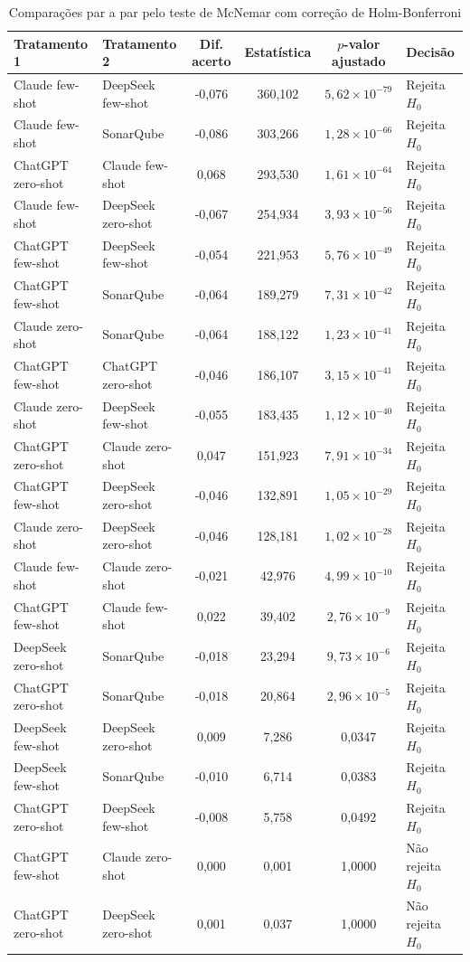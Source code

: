 \begin{table}[H]
\centering
\caption{Comparações par a par pelo teste de McNemar com correção de Holm-Bonferroni}
\label{tab:mcnemar-holm}
\scriptsize
\begin{tabular}{llcccl}
\hline
Tratamento 1 & Tratamento 2 & Dif. acerto & Estatística & $p$-valor ajustado & Decisão \\
\hline
Claude few-shot & DeepSeek few-shot & -0,076 & 360,102 & $5{,}62 \times 10^{-79}$ & Rejeita $H_0$ \\
Claude few-shot & SonarQube & -0,086 & 303,266 & $1{,}28 \times 10^{-66}$ & Rejeita $H_0$ \\
ChatGPT zero-shot & Claude few-shot & 0,068 & 293,530 & $1{,}61 \times 10^{-64}$ & Rejeita $H_0$ \\
Claude few-shot & DeepSeek zero-shot & -0,067 & 254,934 & $3{,}93 \times 10^{-56}$ & Rejeita $H_0$ \\
ChatGPT few-shot & DeepSeek few-shot & -0,054 & 221,953 & $5{,}76 \times 10^{-49}$ & Rejeita $H_0$ \\
ChatGPT few-shot & SonarQube & -0,064 & 189,279 & $7{,}31 \times 10^{-42}$ & Rejeita $H_0$ \\
Claude zero-shot & SonarQube & -0,064 & 188,122 & $1{,}23 \times 10^{-41}$ & Rejeita $H_0$ \\
ChatGPT few-shot & ChatGPT zero-shot & -0,046 & 186,107 & $3{,}15 \times 10^{-41}$ & Rejeita $H_0$ \\
Claude zero-shot & DeepSeek few-shot & -0,055 & 183,435 & $1{,}12 \times 10^{-40}$ & Rejeita $H_0$ \\
ChatGPT zero-shot & Claude zero-shot & 0,047 & 151,923 & $7{,}91 \times 10^{-34}$ & Rejeita $H_0$ \\
ChatGPT few-shot & DeepSeek zero-shot & -0,046 & 132,891 & $1{,}05 \times 10^{-29}$ & Rejeita $H_0$ \\
Claude zero-shot & DeepSeek zero-shot & -0,046 & 128,181 & $1{,}02 \times 10^{-28}$ & Rejeita $H_0$ \\
Claude few-shot & Claude zero-shot & -0,021 & 42,976 & $4{,}99 \times 10^{-10}$ & Rejeita $H_0$ \\
ChatGPT few-shot & Claude few-shot & 0,022 & 39,402 & $2{,}76 \times 10^{-9}$ & Rejeita $H_0$ \\
DeepSeek zero-shot & SonarQube & -0,018 & 23,294 & $9{,}73 \times 10^{-6}$ & Rejeita $H_0$ \\
ChatGPT zero-shot & SonarQube & -0,018 & 20,864 & $2{,}96 \times 10^{-5}$ & Rejeita $H_0$ \\
DeepSeek few-shot & DeepSeek zero-shot & 0,009 & 7,286 & 0,0347 & Rejeita $H_0$ \\
DeepSeek few-shot & SonarQube & -0,010 & 6,714 & 0,0383 & Rejeita $H_0$ \\
ChatGPT zero-shot & DeepSeek few-shot & -0,008 & 5,758 & 0,0492 & Rejeita $H_0$ \\
ChatGPT few-shot & Claude zero-shot & 0,000 & 0,001 & 1,0000 & Não rejeita $H_0$ \\
ChatGPT zero-shot & DeepSeek zero-shot & 0,001 & 0,037 & 1,0000 & Não rejeita $H_0$ \\
\hline
\end{tabular}


\end{table}
